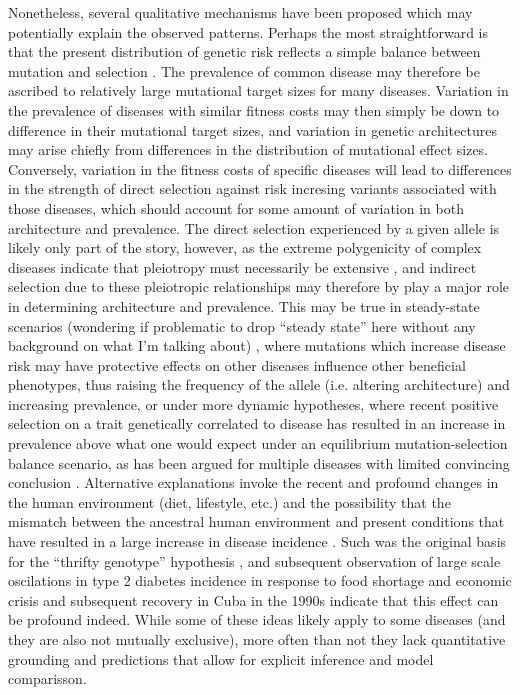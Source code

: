 \documentclass[11pt]{article}
\newcommand{\jb}[1]{{\color{blue} (#1)} }
\begin{document}
Nonetheless, several qualitative mechanisms have been proposed which may potentially explain the observed patterns. Perhaps the most straightforward is that the present distribution of genetic risk reflects a simple balance between mutation and selection \cite{Johnson:2005do}. The prevalence of common disease may therefore be ascribed to relatively large mutational target sizes for many diseases. Variation in the prevalence of diseases with similar fitness costs may then simply be down to difference in their mutational target sizes, and variation in genetic architectures may arise chiefly from differences in the distribution of mutational effect sizes. Conversely, variation in the fitness costs of specific diseases will lead to differences in the strength of direct selection against risk incresing variants associated with those diseases, which should account for some amount of variation in both architecture and prevalence. The direct selection experienced by a given allele is likely only part of the story, however, as the extreme polygenicity of complex diseases indicate that pleiotropy must necessarily be extensive \cite{Pickrell:2016ko, Visscher:2016fp}, and indirect selection due to these pleiotropic relationships may therefore by play a major role in determining architecture and prevalence. This may be true in steady-state scenarios \jb{wondering if problematic to drop ``steady state'' here without any background on what I'm talking about}, where mutations which increase disease risk may have protective effects on other diseases influence other beneficial phenotypes, thus raising the frequency of the allele (i.e. altering architecture) and increasing prevalence, or under more dynamic hypotheses, where recent positive selection on a trait genetically correlated to disease has resulted in an increase in prevalence above what one would expect under an equilibrium mutation-selection balance scenario, as has been argued for multiple diseases with limited convincing conclusion \cite{Fraser:2013jj,Berg:2014bs, Corona:2013cl, Chen:2012jv, Ayub:2014hk,Polimanti:2017bv}. Alternative explanations invoke the recent and profound changes in the human environment (diet, lifestyle, etc.) and the possibility that the mismatch between the ancestral human environment and present conditions that have resulted in a large increase in disease incidence \cite{Gibson:2000vi, Gibson:2009ie}. Such was the original basis for the ``thrifty genotype'' hypothesis \cite{Neel:1962tj, Neel:1999tu}, and subsequent observation of large scale oscilations in type 2 diabetes incidence in response to food shortage and economic crisis and subsequent recovery in Cuba in the 1990s \cite{Franco:2013hb} indicate that this effect can be profound indeed. While some of these ideas likely apply to some diseases (and they are also not mutually exclusive), more often than not they lack quantitative grounding and predictions that allow for explicit inference and model comparisson. 
\end{document}
